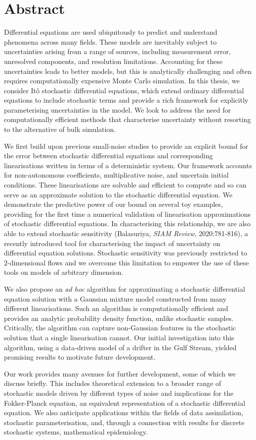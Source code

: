 \chapter{Abstract}
\small
Differential equations are used ubiquitously to predict and understand phenomena across many fields.
These models are inevitably subject to uncertainties arising from a range of sources, including measurement error, unresolved components, and resolution limitations.
Accounting for these uncertainties leads to better models, but this is analytically challenging and often requires computationally expensive Monte Carlo simulation.
In this thesis, we consider It\^o stochastic differential equations, which extend ordinary differential equations to include stochastic terms and provide a rich framework for explicitly parameterising uncertainties in the model.
We look to address the need for computationally efficient methods that characterise uncertainty without resorting to the alternative of bulk simulation.

We first build upon previous small-noise studies to provide an explicit bound for the error between stochastic differential equations and corresponding linearisations written in terms of a deterministic system.
Our framework accounts for non-autonomous coefficients, multiplicative noise, and uncertain initial conditions.
These linearisations are solvable and efficient to compute and so can serve as an approximate solution to the stochastic differential equation.
We demonstrate the predictive power of our bound on several toy examples, providing for the first time a numerical validation of linearisation approximations of stochastic differential equations.
In characterising this relationship, we are also able to extend stochastic sensitivity (Balasuriya, \emph{SIAM Review}, 2020:781-816), a recently introduced tool for characterising the impact of uncertainty on differential equation solutions.
Stochastic sensitivity was previously restricted to 2-dimensional flows and we overcome this limitation to empower the use of these tools on models of arbitrary dimension.

We also propose an \emph{ad hoc} algorithm for approximating a stochastic differential equation solution with a Gaussian mixture model constructed from many different linearisations.
Such an algorithm is computationally efficient and provides an analytic probability density function, unlike stochastic samples.
Critically, the algorithm can capture non-Gaussian features in the stochastic solution that a single linearisation cannot.
Our initial investigation into this algorithm, using a data-driven model of a drifter in the Gulf Stream, yielded promising results to motivate future development.

Our work provides many avenues for further development, some of which we discuss briefly.
This includes theoretical extension to a broader range of stochastic models driven by different types of noise and implications for the Fokker-Planck equation, an equivalent representation of a stochastic differential equation.
We also anticipate applications within the fields of data assimilation, stochastic parameterisation, and, through a connection with results for discrete stochastic systems, mathematical epidemiology.
